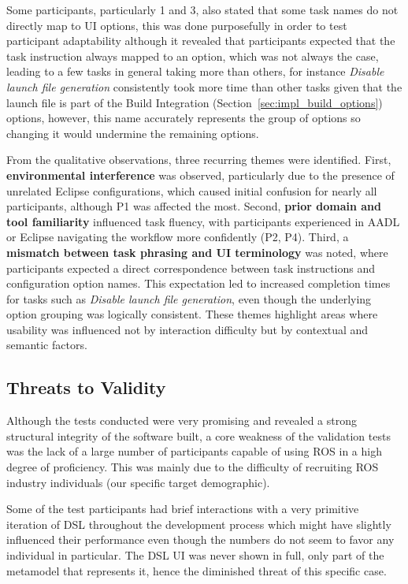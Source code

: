 Some participants, particularly 1 and 3, also stated that some task names do not directly map to \gls{UI} options, this was done purposefully in order to test participant adaptability although it revealed that participants expected that the task instruction always mapped to an option, which was not always the case, leading to a few tasks in general taking more than others, for instance \textit{Disable launch file generation} consistently took more time than other tasks given that the launch file is part of the Build Integration (Section~\ref{sec:impl_build_options}) options, however, this name accurately represents the group of options so changing it would undermine the remaining options.

From the qualitative observations, three recurring themes were identified. 
First, \textbf{environmental interference} was observed, particularly due to the presence of unrelated Eclipse configurations, which caused initial confusion for nearly all participants, although P1 was affected the most. 
Second, \textbf{prior domain and tool familiarity} influenced task fluency, with participants experienced in \gls{AADL} or Eclipse navigating the workflow more confidently (P2, P4). 
Third, a \textbf{mismatch between task phrasing and UI terminology} was noted, where participants expected a direct correspondence between task instructions and configuration option names. This expectation led to increased completion times for tasks such as \textit{Disable launch file generation}, even though the underlying option grouping was logically consistent. 
These themes highlight areas where usability was influenced not by interaction difficulty but by contextual and semantic factors.


\subsection{Threats to Validity}
\label{sec:test_usabl_validity}

Although the tests conducted were very promising and revealed a strong structural integrity of the software built, a core weakness of the validation tests was the lack of a large number of participants capable of using \gls{ROS} in a high degree of proficiency. This was mainly due to the difficulty of recruiting \gls{ROS} industry individuals (our specific target demographic).

Some of the test participants had brief interactions with a very primitive iteration of \gls{DSL} throughout the development process which might have slightly influenced their performance even though the numbers do not seem to favor any individual in particular. The \gls{DSL} UI was never shown in full, only part of the \gls{metamodel} that represents it, hence the diminished threat of this specific case.

